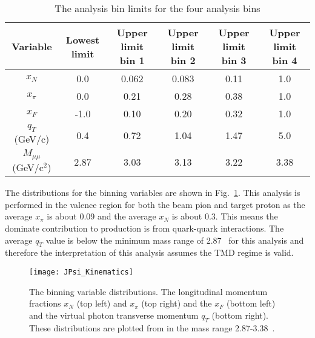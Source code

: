 \begin{table}[h!t]
  \begin{adjustwidth}{-1.4cm}{}
  \centering
  \begin{tabular}{ |c|c|c|c|c|c| }
    \hline \textbf{Variable}& \textbf{Lowest limit}& \textbf{Upper limit bin
      1}& \textbf{Upper limit bin 2}& \textbf{Upper limit bin 3}&
    \textbf{Upper limit bin 4}\\ \hline
    
    $x_N$& 0.0& 0.062& 0.083& 0.11& 1.0\\ \hline
    
    $x_{\pi}$& 0.0& 0.21& 0.28& 0.38& 1.0\\ \hline
    
    $x_F$& -1.0& 0.10& 0.20& 0.32& 1.0\\ \hline
    
    $q_T$ (GeV/c)& 0.4& 0.72& 1.04& 1.47& 5.0\\ \hline
    
    $M_{\mu\mu}$ (GeV/c$^2$)& 2.87& 3.03& 3.13& 3.22& 3.38 \\ \hline
    
  \end{tabular}
  \caption{The {\jp} analysis bin limits for the four analysis bins}
  \label{tab::JPsi_binning}
  \end{adjustwidth}
\end{table}

The distributions for the binning variables are shown in
Fig.~\ref{fig::JPsi_Kinematics}.  This analysis is performed in the valence
region for both the beam pion and target proton as the average $x_\pi$ is about
0.09 and the average $x_N$ is about 0.3.  This means the dominate contribution
to {\jp} production is from quark-quark interactions.  The average $q_T$ value
is below the minimum mass range of 2.87~{\gvcw} for this analysis and therefore
the interpretation of this analysis assumes the TMD regime is valid.

\begin{figure}[h!t]
  \centering \texttt{[image: JPsi\_Kinematics]}
  \caption{The binning variable distributions. The longitudinal momentum
    fractions $x_N$ (top left) and $x_\pi$ (top right) and the $x_F$ (bottom
    left) and the virtual photon transverse momentum $q_T$ (bottom right).
    These distributions are plotted from in the mass range 2.87-3.38~{\gvcw}.}
  \label{fig::JPsi_Kinematics}
\end{figure}


